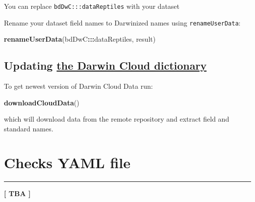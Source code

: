 \documentclass[]{book}
\newenvironment{Shaded}{\begin{snugshade}}{\end{snugshade}}
\newcommand{\KeywordTok}[1]{\textcolor[rgb]{0.13,0.29,0.53}{\textbf{#1}}}
\newcommand{\DataTypeTok}[1]{\textcolor[rgb]{0.13,0.29,0.53}{#1}}
\newcommand{\StringTok}[1]{\textcolor[rgb]{0.31,0.60,0.02}{#1}}
\newcommand{\OperatorTok}[1]{\textcolor[rgb]{0.81,0.36,0.00}{\textbf{#1}}}
\newcommand{\NormalTok}[1]{#1}
\theoremstyle{definition}
\theoremstyle{definition}
\theoremstyle{definition}
\theoremstyle{remark}
\begin{document}
\begin{Shaded}
\end{Shaded}

You can replace \texttt{bdDwC:::dataReptiles} with your dataset

Rename your dataset field names to Darwinized names using
\texttt{renameUserData}:

\begin{Shaded}
\begin{Highlighting}[]
\KeywordTok{renameUserData}\NormalTok{(bdDwC}\OperatorTok{:::}\NormalTok{dataReptiles, result)}
\end{Highlighting}
\end{Shaded}

\section{\texorpdfstring{Updating
\protect\hyperlink{the-darwin-cloud-dictionary}{the Darwin Cloud
dictionary}}{Updating the Darwin Cloud dictionary}}\label{updating-the-darwin-cloud-dictionary}

To get newest version of Darwin Cloud Data run:

\begin{Shaded}
\begin{Highlighting}[]
\KeywordTok{downloadCloudData}\NormalTok{()}
\end{Highlighting}
\end{Shaded}

which will download data from the remote repository and extract field
and standard names.

\chapter{Checks YAML file}\label{checks-yaml-file}

\begin{center}\rule{0.5\linewidth}{\linethickness}\end{center}

\textbf{{{[} TBA {]}}}
\end{document}
